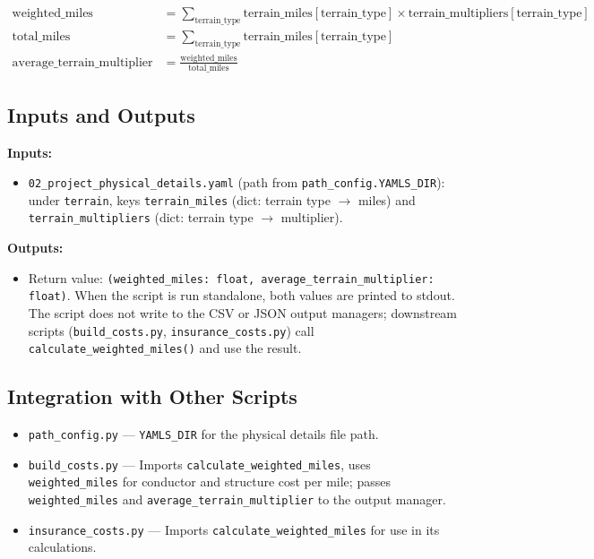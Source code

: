 \documentclass[ctcc_full_documentation.tex]{subfiles}
\begin{document}
\begin{align}
\text{weighted\_miles} &= \sum_{\text{terrain\_type}} \text{terrain\_miles}[\text{terrain\_type}] \times \text{terrain\_multipliers}[\text{terrain\_type}] \\
\text{total\_miles} &= \sum_{\text{terrain\_type}} \text{terrain\_miles}[\text{terrain\_type}] \\
\text{average\_terrain\_multiplier} &= \frac{\text{weighted\_miles}}{\text{total\_miles}}
\end{align}

\subsection{Inputs and Outputs}

\textbf{Inputs:}
\begin{itemize}
    \item \texttt{02\_project\_physical\_details.yaml} (path from \texttt{path\_config.YAMLS\_DIR}): under \texttt{terrain}, keys \texttt{terrain\_miles} (dict: terrain type $\to$ miles) and \texttt{terrain\_multipliers} (dict: terrain type $\to$ multiplier).
\end{itemize}

\textbf{Outputs:}
\begin{itemize}
    \item Return value: \texttt{(weighted\_miles: float, average\_terrain\_multiplier: float)}. When the script is run standalone, both values are printed to stdout. The script does not write to the CSV or JSON output managers; downstream scripts (\texttt{build\_costs.py}, \texttt{insurance\_costs.py}) call \texttt{calculate\_weighted\_miles()} and use the result.
\end{itemize}

\subsection{Integration with Other Scripts}

\begin{itemize}
    \item \texttt{path\_config.py} --- \texttt{YAMLS\_DIR} for the physical details file path.
    \item \texttt{build\_costs.py} --- Imports \texttt{calculate\_weighted\_miles}, uses \texttt{weighted\_miles} for conductor and structure cost per mile; passes \texttt{weighted\_miles} and \texttt{average\_terrain\_multiplier} to the output manager.
    \item \texttt{insurance\_costs.py} --- Imports \texttt{calculate\_weighted\_miles} for use in its calculations.
\end{itemize}
\end{document}
